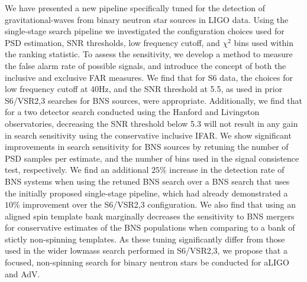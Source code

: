 We have presented a new pipeline specifically tuned for the detection
of gravitational-waves from binary neutron star sources in LIGO data. 
Using the single-stage search pipeline we investigated the configuration
choices used for PSD estimation, SNR thresholds, low frequency cutoff, 
and $\chi^2$ bins used within the ranking statistic. 
To assess the sensitivity, we develop a method to measure the false 
alarm rate of possible signals, and introduce the concept of both the
inclusive and exclusive FAR measures. We find that for S6 data, the 
choices for low frequency cutoff at 40Hz, and the SNR threshold at 5.5,
as used in prior S6/VSR2,3 searches for BNS sources, were appropriate.
Additionally, we find that for a two detector search conducted using
the Hanford and Livingston observatories, decreasing the SNR threshold
below 5.3 will not result in any gain in search sensitivity using the conservative 
inclusive IFAR. We show significant
improvements in search sensitivity for BNS sources by retuning the number of PSD
samples per estimate, and the number of bins used in the signal consistence test,
respectively. We find an additional $25\%$ increase in the detection rate
of BNS systems when using the retuned BNS search over a BNS search that
uses the initially proposed single-stage pipeline,
which had already demonstrated a $10\%$ improvement over the S6/VSR2,3 configuration.
We also find that using an aligned spin template bank marginally decreases the sensitivity 
to BNS mergers for conservative estimates of the BNS populations when
comparing to a bank of stictly non-spinning templates. As these tuning significantly
differ from those used in the wider lowmass search performed in S6/VSR2,3, 
we propose that a focused, non-spinning search for binary neutron
stars be conducted for aLIGO and AdV.
